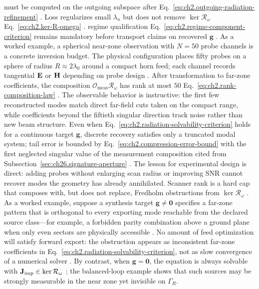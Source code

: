 must be computed on the outgoing subspace after Eq.~\eqref{eq:ch2.outgoing-radiation-refinement}
\cite{stratton1941}. Loss regularizes small \(\lambda_n\) but does not remove
\(\ker\mathcal{R}_\omega\) Eq.~\eqref{eq:ch2.ker-R-omega} \cite{harrington2001}.
regime qualification Eq.~\eqref{eq:ch2.regime-component-criterion} remains mandatory before transport claims
on recovered \(\mathbf{g}\) \cite{stratton1941}.
As a worked example, a spherical near-zone observation with $N=50$ probe channels is a concrete inversion budget.
The physical configuration places fifty probes on a sphere of radius $R\approx 2\lambda_0$ around
a compact horn feed; each channel records tangential $\mathbf{E}$ or $\mathbf{H}$ depending on probe design
\cite{hansen1988}. After transformation to far-zone coefficients, the composition
$\mathcal{O}_{\mathrm{meas}}\mathcal{R}_\omega$ has rank at most $50$
Eq.~\eqref{eq:ch2.rank-composition-law} \cite{stratton1941}. The observable behavior is
instructive: the first few reconstructed modes match direct far-field cuts taken on the compact
range, while coefficients beyond the fiftieth singular direction track noise rather than new
beam structure.
Even when Eq.~\eqref{eq:ch2.radiation-solvability-criterion} holds for a continuous target
$\mathbf{g}$, discrete recovery satisfies only a truncated modal system; tail error is bounded
by Eq.~\eqref{eq:ch2.compression-error-bound} with the first neglected singular value of the
measurement composition cited from Subsection~\ref{sec:ch26.signature-aperture}
\cite{harrington2001}. The lesson for experimental design is direct: adding probes without
enlarging scan radius or improving SNR cannot recover modes the geometry has already annihilated.
Scanner rank is a hard cap that composes with, but does not replace, Fredholm obstructions from
$\ker\mathcal{R}_\omega$ \cite{stratton1941}.
As a worked example, suppose a synthesis target $\mathbf{g}\neq\mathbf{0}$ specifies a far-zone pattern that is
orthogonal to every exporting mode reachable from the declared source class---for example, a
forbidden parity combination above a ground plane when only even sectors are physically
accessible \cite{collin2001}. No amount of feed optimization will satisfy forward
export: the obstruction appears as inconsistent far-zone coefficients in
Eq.~\eqref{eq:ch2.radiation-solvability-criterion}, not as slow convergence of a numerical
solver \cite{harrington2001}. By contrast, when $\mathbf{g}=\mathbf{0}$, the equation is always
solvable with $\mathbf{J}_{\mathrm{imp}}\in\ker\mathcal{R}_\omega$ \cite{stratton1941}; the balanced-loop example
shows that such sources may be strongly measurable in the near zone yet invisible on $\Gamma_R$.
